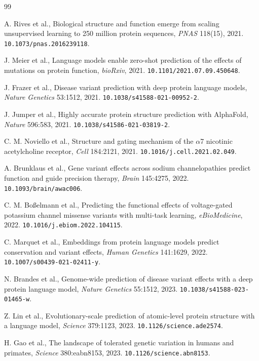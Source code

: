 \documentclass[11pt]{article}
\begin{document}
\begin{thebibliography}{99}\setlength{\itemsep}{1pt}\small

 A. Rives et al., Biological structure and function emerge from scaling unsupervised learning to 250 million protein sequences, \emph{PNAS} 118(15), 2021. \texttt{10.1073/pnas.2016239118}.

 J. Meier et al., Language models enable zero-shot prediction of the effects of mutations on protein function, \emph{bioRxiv}, 2021. \texttt{10.1101/2021.07.09.450648}.

 J. Frazer et al., Disease variant prediction with deep protein language models, \emph{Nature Genetics} 53:1512, 2021. \texttt{10.1038/s41588-021-00952-2}.

 J. Jumper et al., Highly accurate protein structure prediction with AlphaFold, \emph{Nature} 596:583, 2021. \texttt{10.1038/s41586-021-03819-2}.

 C. M. Noviello et al., Structure and gating mechanism of the $\alpha$7 nicotinic acetylcholine receptor, \emph{Cell} 184:2121, 2021. \texttt{10.1016/j.cell.2021.02.049}.

 A. Brunklaus et al., Gene variant effects across sodium channelopathies predict function and guide precision therapy, \emph{Brain} 145:4275, 2022. \texttt{10.1093/brain/awac006}.

 C. M. Bo{\ss}elmann et al., Predicting the functional effects of voltage-gated potassium channel missense variants with multi-task learning, \emph{eBioMedicine}, 2022. \texttt{10.1016/j.ebiom.2022.104115}.

 C. Marquet et al., Embeddings from protein language models predict conservation and variant effects, \emph{Human Genetics} 141:1629, 2022. \texttt{10.1007/s00439-021-02411-y}.

 N. Brandes et al., Genome-wide prediction of disease variant effects with a deep protein language model, \emph{Nature Genetics} 55:1512, 2023. \texttt{10.1038/s41588-023-01465-w}.

 Z. Lin et al., Evolutionary-scale prediction of atomic-level protein structure with a language model, \emph{Science} 379:1123, 2023. \texttt{10.1126/science.ade2574}.

 H. Gao et al., The landscape of tolerated genetic variation in humans and primates, \emph{Science} 380:eabn8153, 2023. \texttt{10.1126/science.abn8153}.


\end{thebibliography}
\end{document}
